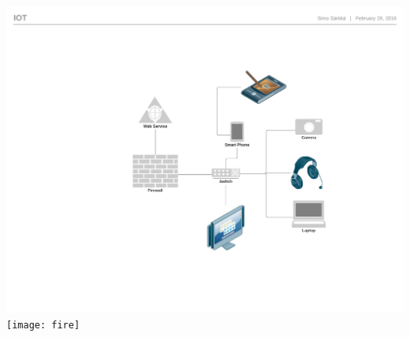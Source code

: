 \documentclass[xcolor=svgnames,english,presentation]{beamer}
\begin{document}
\begin{frame}
\begin{columns}
\begin{column}{0.3\textwidth}
  \includegraphics[width=0.8\columnwidth]{IoT} \\
  \texttt{[image: fire]}
  \end{column}
  \end{columns}
\end{frame}
\end{document}
